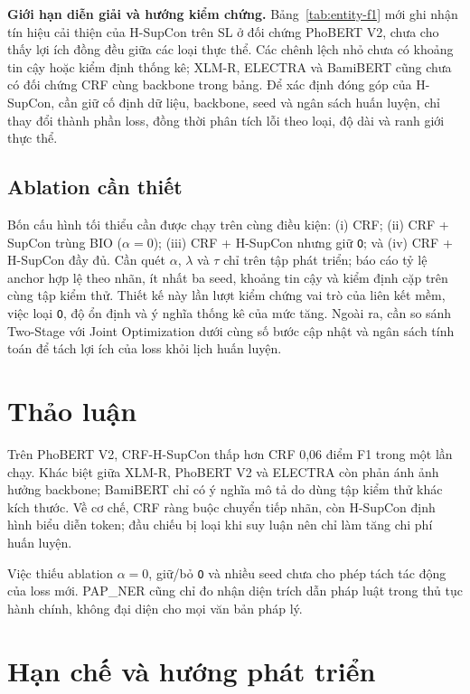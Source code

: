 \documentclass[conference,a4paper]{IEEEtran}
\begin{document}
\noindent\textbf{Giới hạn diễn giải và hướng kiểm chứng.}
Bảng~\ref{tab:entity-f1} mới ghi nhận tín hiệu cải thiện của H-SupCon
trên SL ở đối chứng PhoBERT V2, chưa cho thấy lợi ích đồng đều giữa
các loại thực thể. Các chênh lệch nhỏ chưa có khoảng tin cậy hoặc
kiểm định thống kê; XLM-R, ELECTRA và BamiBERT cũng chưa có đối chứng
CRF cùng backbone trong bảng. Để xác định đóng góp của H-SupCon,
cần giữ cố định dữ liệu, backbone, seed và ngân sách huấn luyện,
chỉ thay đổi thành phần loss, đồng thời phân tích lỗi theo loại,
độ dài và ranh giới thực thể.

\subsection{Ablation cần thiết}\label{subsec:resources}

Bốn cấu hình tối thiểu cần được chạy trên cùng điều kiện: (i) CRF;
(ii) CRF + SupCon trùng BIO ($\alpha=0$); (iii) CRF + H-SupCon nhưng giữ
\texttt{O}; và (iv) CRF + H-SupCon đầy đủ. Cần quét $\alpha$, $\lambda$
và $\tau$ chỉ trên tập phát triển; báo cáo tỷ lệ anchor hợp lệ theo nhãn,
ít nhất ba seed, khoảng tin cậy và kiểm định cặp trên cùng tập kiểm thử.
Thiết kế này lần lượt kiểm chứng vai trò của liên kết mềm, việc loại
\texttt{O}, độ ổn định và ý nghĩa thống kê của mức tăng. Ngoài ra, cần
so sánh Two-Stage với Joint Optimization dưới cùng số bước cập nhật và
ngân sách tính toán để tách lợi ích của loss khỏi lịch huấn luyện.

\section{Thảo luận}\label{sec:discussion}

Trên PhoBERT V2, CRF-H-SupCon thấp hơn CRF 0,06 điểm F1 trong một lần chạy.
Khác biệt giữa XLM-R, PhoBERT V2 và ELECTRA còn phản ánh ảnh hưởng backbone;
BamiBERT chỉ có ý nghĩa mô tả do dùng tập kiểm thử khác kích thước. Về cơ
chế, CRF ràng buộc chuyển tiếp nhãn, còn H-SupCon định hình biểu diễn token;
đầu chiếu bị loại khi suy luận nên chỉ làm tăng chi phí huấn luyện.

Việc thiếu ablation $\alpha=0$, giữ/bỏ \texttt{O} và nhiều seed chưa cho
phép tách tác động của loss mới. PAP\_NER cũng chỉ đo nhận diện trích dẫn
pháp luật trong thủ tục hành chính, không đại diện cho mọi văn bản pháp lý.

\section{Hạn chế và hướng phát triển}\label{sec:limitations}
\end{document}
